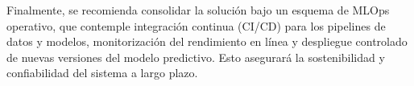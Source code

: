 \documentclass{univalle-perfil}
\begin{document}
Finalmente, se recomienda consolidar la solución bajo un esquema de MLOps
operativo, que contemple integración continua (CI/CD) para los pipelines de datos y
modelos, monitorización del rendimiento en línea y despliegue controlado de nuevas
versiones del modelo predictivo. Esto asegurará la sostenibilidad y confiabilidad del
sistema a largo plazo.

\end{document}
